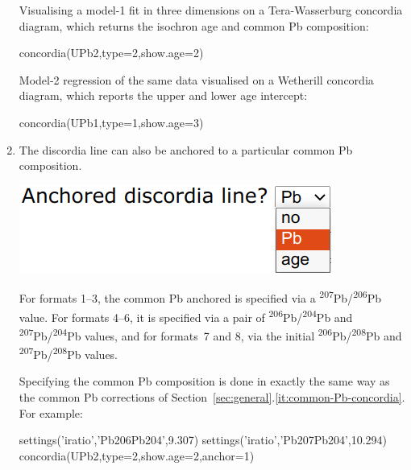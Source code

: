 \begin{refsection}
\begin{enumerate}
  \noindent Visualising a model-1 fit in three dimensions on a
  Tera-Wasserburg concordia diagram, which returns the isochron age
  and common Pb composition:
\begin{console}
concordia(UPb2,type=2,show.age=2)
\end{console}

\noindent Model-2 regression of the same data visualised on a
Wetherill concordia diagram, which reports the upper and lower age
intercept:
\begin{console}
concordia(UPb1,type=1,show.age=3)
\end{console}

\item The discordia line can also be anchored to a particular common
  Pb composition.
  
  \noindent\begin{minipage}[t]{.3\linewidth}
  \strut\vspace*{-\baselineskip}\newline
  \includegraphics[width=\linewidth]{../figures/anchoreddiscordia.png}
  \end{minipage}
  \begin{minipage}[t]{.7\linewidth}
For formats 1--3, the common Pb anchored is specified via a
\textsuperscript{207}Pb/\textsuperscript{206}Pb value. For formats
4--6, it is specified via a pair of
\textsuperscript{206}Pb/\textsuperscript{204}Pb and
\textsuperscript{207}Pb/\textsuperscript{204}Pb values, and for
formats~7 and 8, via the initial
\textsuperscript{206}Pb/\textsuperscript{208}Pb and
\textsuperscript{207}Pb/\textsuperscript{208}Pb values.    
  \end{minipage}

\noindent Specifying the common Pb composition is done in exactly the
same way as the common Pb corrections of
Section~\ref{sec:general}.\ref{it:common-Pb-concordia}. For example:

\begin{script}
settings('iratio','Pb206Pb204',9.307)
settings('iratio','Pb207Pb204',10.294)
concordia(UPb2,type=2,show.age=2,anchor=1)
\end{script}


\end{enumerate}
\end{refsection}
